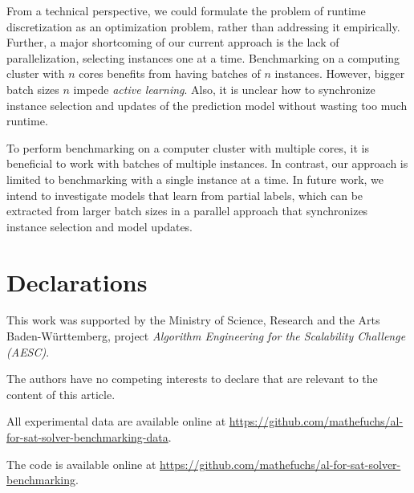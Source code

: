 \documentclass[sn-basic, Numbered]{sn-jnl} %
\begin{document}
From a technical perspective, we could formulate the problem of runtime discretization as an optimization problem, rather than addressing it empirically.
Further, a major shortcoming of our current approach is the lack of parallelization, selecting instances one at a time.
Benchmarking on a computing cluster with $n$ cores benefits from having batches of $n$ instances.
However, bigger batch sizes $n$ impede \emph{active learning}.
Also, it is unclear how to synchronize instance selection and updates of the prediction model without wasting too much runtime.

To perform benchmarking on a computer cluster with multiple cores, it is beneficial to work with batches of multiple instances.
In contrast, our approach is limited to benchmarking with a single instance at a time.
In future work, we intend to investigate models that learn from partial labels, which can be extracted from larger batch sizes in a parallel approach that synchronizes instance selection and model updates.

\backmatter

\section*{Declarations}


This work was supported by the Ministry of Science, Research and the Arts Baden-Württemberg, project \emph{Algorithm Engineering for the Scalability Challenge (AESC)}.


The authors have no competing interests to declare that are relevant to the content of this article.


All experimental data are available online at \url{https://github.com/mathefuchs/al-for-sat-solver-benchmarking-data}.


The code is available online at \url{https://github.com/mathefuchs/al-for-sat-solver-benchmarking}.


\end{document}
